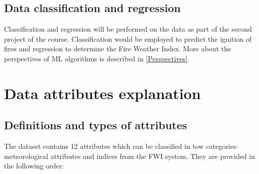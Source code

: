 \documentclass[10pt]{article}
\numberwithin{equation}{section}
\numberwithin{figure}{section}
\numberwithin{table}{section}
\begin{document}
\subsection{Data classification and regression}
Classification and regression will be performed on the data as part of the second project of the course. Classification would be employed to predict the ignition of fires and regression to determine the Fire Weather Index. More about the perspectives of ML algorithms is described in \autoref{Perspectives}. 


\section{Data attributes explanation}

\subsection{Definitions and types  of attributes}
The dataset contains 12 attributes which can be classified in tow categories: meteorological attributes and indices from the FWI system. They are provided in the following order:
\end{document}
